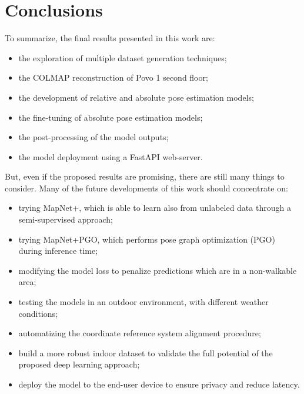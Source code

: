 \section{Conclusions}
To summarize, the final results presented in this work are:
\begin{itemize}
    \item the exploration of multiple dataset generation techniques;
    \item the COLMAP reconstruction of Povo 1 second floor;
    \item the development of relative and absolute pose estimation models;
    \item the fine-tuning of absolute pose estimation models;
    \item the post-processing of the model outputs;
    \item the model deployment using a FastAPI web-server. 
\end{itemize}

But, even if the proposed results are promising, there are still many things to consider.
Many of the future developments of this work should concentrate on:
\begin{itemize}
    \item trying MapNet+, which is able to learn also from unlabeled data through a semi-supervised approach;
    \item trying MapNet+PGO, which performs pose graph optimization (PGO) during inference time;
    \item modifying the model loss to penalize predictions which are in a non-walkable area;
    \item testing the models in an outdoor environment, with different weather conditions;
    \item automatizing the coordinate reference system alignment procedure;
    \item build a more robust indoor dataset to validate the full potential of the proposed deep learning approach;
    \item deploy the model to the end-user device to ensure privacy and reduce latency.
\end{itemize}
